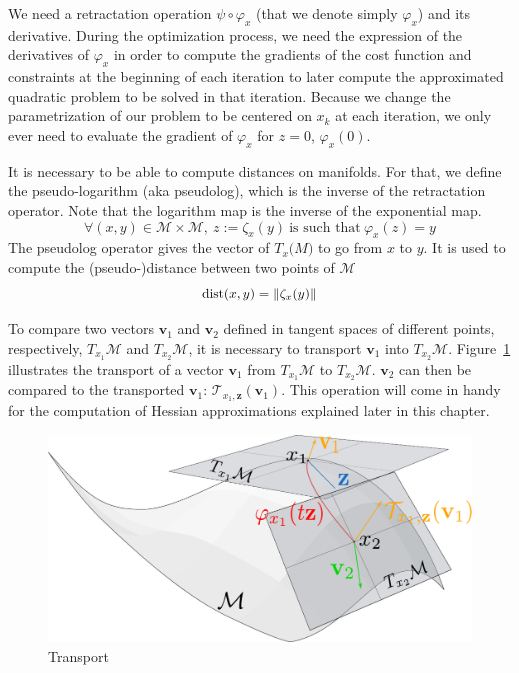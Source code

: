 We need a retractation operation $\psi\circ\varphi_x$ (that we denote simply $\varphi_x$) and its derivative.
During the optimization process, we need the expression of the derivatives of $\varphi_x$ in order to compute the gradients of the cost function and constraints at the beginning of each iteration to later compute the approximated quadratic problem to be solved in that iteration.
Because we change the parametrization of our problem to be centered on $x_k$ at each iteration, we only ever need to evaluate the gradient of $\varphi_x$ for $z=0$, $\varphi_x(0)$.

It is necessary to be able to compute distances on manifolds.
For that, we define the pseudo-logarithm (aka pseudolog), which is the inverse of the retractation operator.
Note that the logarithm map is the inverse of the exponential map.
\begin{equation*}
  \forall (x,y)\in \mathcal{M}\times\mathcal{M},\ z:=\zeta_x(y)\ \text{is such that}\ \varphi_x(z) = y
\end{equation*}
The pseudolog operator gives the vector of $T_x\mathcal(M)$ to go from $x$ to $y$.
It is used to compute the (pseudo-)distance between two points of $\mathcal{M}$
\begin{equation*}
  \operatorname{dist}(x,y) = \|\zeta_x(y)\|
\end{equation*}

To compare two vectors $\mathbf{v}_1$ and $\mathbf{v}_2$ defined in tangent spaces of different points, respectively, $T_{x_1}\mathcal{M}$ and $T_{x_2}\mathcal{M}$, it is necessary to transport $\mathbf{v}_1$ into $T_{x_2}\mathcal{M}$.
Figure~\ref{fig:transport} illustrates the transport of a vector $\mathbf{v}_1$ from $T_{x_1}\mathcal{M}$ to $T_{x_2}\mathcal{M}$.
$\mathbf{v}_2$ can then be compared to the transported $\mathbf{v}_1$: $\mathcal{T}_{x_1,\mathbf{z}}(\mathbf{v}_1)$.
This operation will come in handy for the computation of Hessian approximations explained later in this chapter.

\begin{figure}[htpb]
  \centering
  \includegraphics[width=0.8\linewidth]{transport.pdf}
  \caption{Transport}
  \label{fig:transport}
\end{figure}

